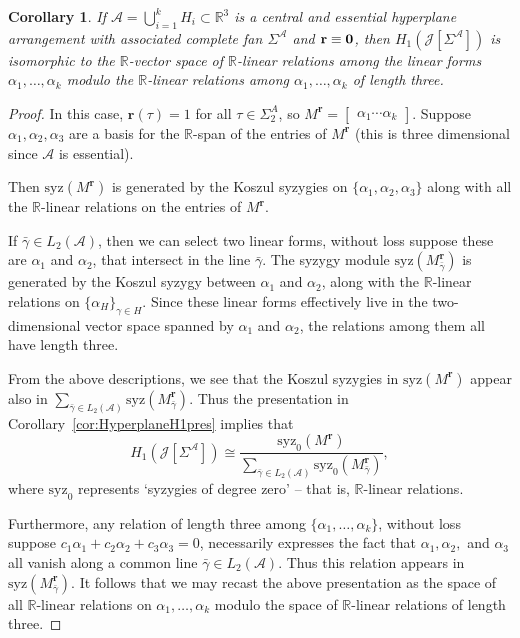 \documentclass[11pt, reqno]{amsart}
\newcommand{\RR}{\mathbb{R}}
\newcommand{\br}{\mathbf{r}}
\newcommand{\calJ}{\mathcal{J}}
\newcommand{\A}{\mathcal{A}}
\newcommand{\syz}{\mathrm{syz}}
\newtheorem{corollary}[theorem]{Corollary}
\theoremstyle{definition}
\theoremstyle{remark}
\numberwithin{equation}{section}
\begin{document}
\begin{corollary}
	If $\A=\bigcup_{i=1}^k H_i\subset\RR^3$ is a central and essential hyperplane arrangement with associated complete fan $\Sigma^\A$ and $\br\equiv \bf{0}$, then $H_1(\calJ[\Sigma^\A])$ is isomorphic to the $\RR$-vector space of $\RR$-linear relations among the linear forms $\alpha_1,\ldots,\alpha_k$ modulo the $\RR$-linear relations among $\alpha_1,\ldots,\alpha_k$ of length three.
\end{corollary}
\begin{proof}
	In this case, $\br(\tau)=1$ for all $\tau\in\Sigma^A_2$, so $M^{\br}=\begin{bmatrix} \alpha_1 \cdots \alpha_k\end{bmatrix}$.  Suppose $\alpha_1,\alpha_2, \alpha_3$ are a basis for the $\RR$-span of the entries of $M^{\br}$ (this is three dimensional since $\A$ is essential).
	
	Then $\syz(M^{\br})$ is generated by the Koszul syzygies on $\{\alpha_1,\alpha_2,\alpha_3\}$ along with all the $\RR$-linear relations on the entries of $M^{\br}$.  
	
	If $\bar{\gamma}\in L_2(\A)$, then we can select two linear forms, without loss suppose these are $\alpha_1$ and $\alpha_2$, that intersect in the line $\bar{\gamma}$.  The syzygy module $\syz(M^{\br}_{\bar{\gamma}})$ is generated by the Koszul syzygy between $\alpha_1$ and $\alpha_2$, along with the $\RR$-linear relations on $\{\alpha_H\}_{\gamma\in H}$.  Since these linear forms effectively live in the two-dimensional vector space spanned by $\alpha_1$ and $\alpha_2$, the relations among them all have length three.
	
	From the above descriptions, we see that the Koszul syzygies in $\syz(M^{\br})$ appear also in $\sum\limits_{\bar{\gamma}\in L_2(\A)}\syz(M^{\br}_{\bar{\gamma}})$.  Thus the presentation in Corollary~\ref{cor:HyperplaneH1pres} implies that 
	\[
	H_1(\calJ[\Sigma^\A])\cong \dfrac{\syz_0 (M^\br)}{\sum_{\bar{\gamma}\in L_2(\A)} \syz_0(M^{\br}_{\bar{\gamma}})},
	\]
	where $\syz_0$ represents `syzygies of degree zero' -- that is, $\RR$-linear relations.
	
	Furthermore, any relation of length three among $\{\alpha_1,\ldots,\alpha_k\}$, without loss suppose $c_1\alpha_1+c_2\alpha_2+c_3\alpha_3=0$, necessarily expresses the fact that $\alpha_1,\alpha_2,$ and $\alpha_3$ all vanish along a common line $\bar{\gamma}\in L_2(\A)$.  Thus this relation appears in $\syz(M^{\br}_{\bar{\gamma}})$.  It follows that we may recast the above presentation as the space of all $\RR$-linear relations on $\alpha_1,\ldots,\alpha_k$ modulo the space of $\RR$-linear relations of length three.
\end{proof}
\end{document}
